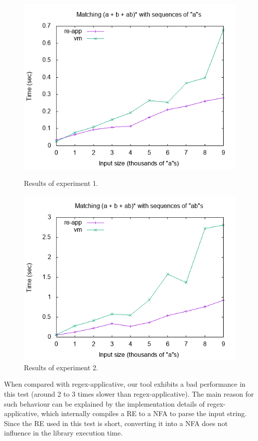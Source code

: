 \documentclass[review]{elsarticle}
\theoremstyle{definition}
\begin{document}
\begin{figure}[h]
  \centering
  \begin{minipage}{0.45\textwidth}
    \includegraphics[width=.9\textwidth]{as.png}
    \caption{Results of experiment 1.}
    \label{fig:graph1}
  \end{minipage} \hfill
  \begin{minipage}{0.45\textwidth}
    \includegraphics[width=.9\textwidth]{abs.png}
    \caption{Results of experiment 2.}
    \label{fig:graph2}
  \end{minipage}
\end{figure}

When compared with regex-applicative, our tool exhibits a bad performance in
this test (around 2 to 3 times slower than regex-applicative). The main reason for 
such behaviour can be explained by the implementation details of
regex-applicative,  which internally compiles a RE 
to a NFA to parse the input string. Since the RE used in this test is short,
converting it into a NFA does not influence in the library execution time.
\end{document}
